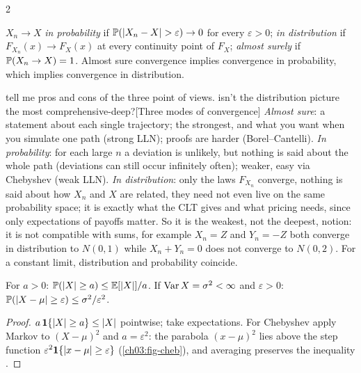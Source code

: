 \begin{paracol}{2}
\begin{definition}
$X_n\to X$ \emph{in probability} if $\Prob(|X_n-X|>\varepsilon)\to0$ for every $\varepsilon>0$; \emph{in distribution} if
$F_{X_n}(x)\to F_X(x)$ at every continuity point of $F_X$; \emph{almost surely} if $\mathbb{P}(X_n\to X)=1$. Almost sure
convergence implies convergence in probability, which implies convergence in distribution.\begin{answer}{tell me pros and cons of the three point of views. isn't the distribution picture the most comprehensive-deep?}[Three modes of convergence]
\emph{Almost sure}: a statement about each single trajectory; the strongest, and what you want when you simulate one path (strong LLN); proofs are harder
(Borel--Cantelli). \emph{In probability}: for each large $n$ a deviation is unlikely, but nothing is said about the whole path (deviations can
still occur infinitely often); weaker, easy via Chebyshev (weak LLN). \emph{In distribution}: only the laws $F_{X_n}$ converge,
nothing is said about how $X_n$ and $X$ are related, they need not even live on the same probability space; it is exactly what the CLT gives
and what pricing needs, since only expectations of payoffs matter. So it is the weakest, not the deepest, notion: it
is not compatible with sums, for example $X_n=Z$ and $Y_n=-Z$ both converge in distribution to $N(0,1)$ while $X_n+Y_n=0$ does not converge
to $N(0,2)$. For a constant limit, distribution and probability coincide.
\end{answer}
\end{definition}

\begin{lemma}\label{ch03:lem-cheb}
For $a>0$: $\mathbb{P}(|X|\ge a)\le\mathbb{E}[|X|]/a$. If $\operatorname{Var} X=\sigma^2<\infty$ and $\varepsilon>0$:
$\mathbb{P}(|X-\mu|\ge\varepsilon)\le\sigma^2/\varepsilon^2$.
\end{lemma}
\begin{proof}
$a\,\mathbf{1}\{|X|\ge a\}\le|X|$ pointwise; take expectations. For Chebyshev apply Markov to $(X-\mu)^2$ and $a=\varepsilon^2$: the
parabola $(x-\mu)^2$ lies above the step function $\varepsilon^2\mathbf{1}\{|x-\mu|\ge\varepsilon\}$ (\cref{ch03:fig-cheb}), and averaging
preserves the inequality .
\end{proof}


\end{paracol}
